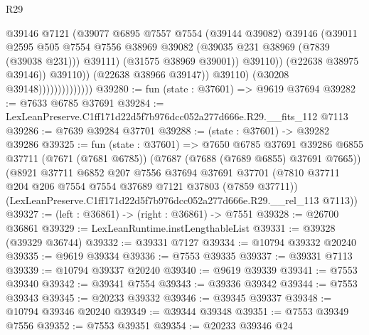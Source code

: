 \begin{lexlean}{R29}
\begin{coremodule}
                                            @39146
                                            @7121
                                            (@39077
                                              @6895
                                              @7557
                                              @7554
                                              (@39144 @39082)
                                              @39146
                                              (@39011
                                                @2595
                                                @505
                                                @7554
                                                @7556
                                                @38969
                                                @39082
                                                (@39035 @231 @38969 (@7839 (@39038 @231)))
                                                @39111)
                                              (@31575 @38969 @39001))
                                            @39110))
                                        (@22638 @38975 @39146))
                                      @39110))
                                  (@22638 @38966 @39147))
                                @39110)
                              (@30208 @39148))))))))))))))
@39280 := fun (state : @37601) => @9619 @37694
@39282 := @7633 @6785 @37691
@39284 := LexLeanPreserve.C1ff171d22d5f7b976dcc052a277d666e.R29.__fits_112 @7113
@39286 := @7639 @39284 @37701
@39288 := (state : @37601) -> @39282 @39286
@39325 := fun (state : @37601) =>
  @7650
    @6785
    @37691
    @39286
    @6855
    @37711
    (@7671 (@7681 @6785))
    (@7687 (@7688 (@7689 @6855) @37691 @7665))
    (@8921
      @37711
      @6852
      @207
      @7556
      @37694
      @37691
      @37701
      (@7810 @37711 @204 @206 @7554 @7554 @37689 @7121 @37803 (@7859 @37711))
      (LexLeanPreserve.C1ff171d22d5f7b976dcc052a277d666e.R29.__rel_113 @7113))
@39327 := (left : @36861) -> (right : @36861) -> @7551
@39328 := @26700 @36861
@39329 := LexLeanRuntime.instLengthableList
@39331 := @39328 (@39329 @36744)
@39332 := @39331 @7127
@39334 := @10794 @39332 @20240
@39335 := @9619 @39334
@39336 := @7553 @39335
@39337 := @39331 @7113
@39339 := @10794 @39337 @20240
@39340 := @9619 @39339
@39341 := @7553 @39340
@39342 := @39341 @7554
@39343 := @39336 @39342
@39344 := @7553 @39343
@39345 := @20233 @39332
@39346 := @39345 @39337
@39348 := @10794 @39346 @20240
@39349 := @39344 @39348
@39351 := @7553 @39349 @7556
@39352 := @7553 @39351
@39354 := @20233 @39346 @24

\end{coremodule}
\end{lexlean}
